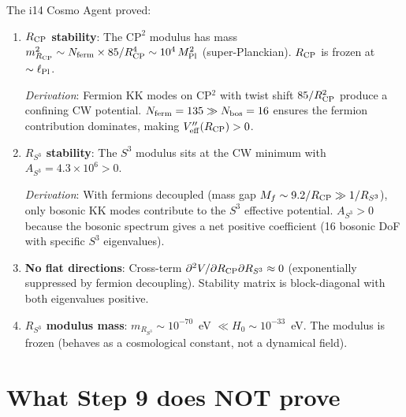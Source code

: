 \documentclass[11pt]{article}
\newcommand{\ee}[1]{\times 10^{#1}}
\newcommand{\lPl}{\ell_{\rm Pl}}
\newcommand{\Mpl}{M_{\rm Pl}}
\begin{document}
The i14 Cosmo Agent proved:

\begin{enumerate}[label=(\alph*)]
\item \textbf{$R_{\rm CP}$ stability}: The $\text{CP}^2$ modulus has
  mass $m_{R_{\rm CP}}^2 \sim N_{\rm ferm} \times 85/R_{\rm CP}^4
  \sim 10^4\,\Mpl^2$ (super-Planckian). $R_{\rm CP}$ is frozen at
  $\sim \lPl$.

  \textit{Derivation}: Fermion KK modes on CP$^2$ with twist shift
  $85/R_{\rm CP}^2$ produce a confining CW potential. $N_{\rm ferm} = 135
  \gg N_{\rm bos} = 16$ ensures the fermion contribution dominates,
  making $V_{\rm eff}''(R_{\rm CP}) > 0$.

\item \textbf{$R_{S^3}$ stability}: The $S^3$ modulus sits at the CW
  minimum with $A_{S^3} = 4.3\ee{6} > 0$.

  \textit{Derivation}: With fermions decoupled (mass gap
  $M_f \sim 9.2/R_{\rm CP} \gg 1/R_{S^3}$), only bosonic KK modes
  contribute to the $S^3$ effective potential. $A_{S^3} > 0$ because
  the bosonic spectrum gives a net positive coefficient (16 bosonic
  DoF with specific $S^3$ eigenvalues).

\item \textbf{No flat directions}: Cross-term
  $\partial^2 V/\partial R_{\rm CP}\partial R_{S^3} \approx 0$
  (exponentially suppressed by fermion decoupling). Stability matrix
  is block-diagonal with both eigenvalues positive.

\item \textbf{$R_{S^3}$ modulus mass}: $m_{R_{S^3}} \sim 10^{-70}$~eV
  $\ll H_0 \sim 10^{-33}$~eV. The modulus is frozen (behaves as
  a cosmological constant, not a dynamical field).
\end{enumerate}

\section{What Step 9 does NOT prove}
\end{document}
